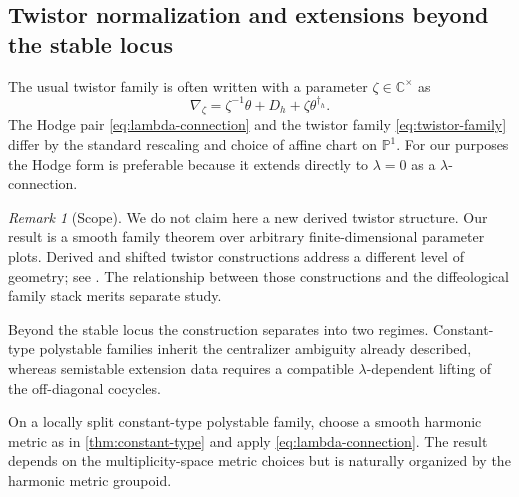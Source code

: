 \documentclass[11pt,reqno]{amsart}
\theoremstyle{definition}
\theoremstyle{remark}
\newtheorem{remark}[theorem]{Remark}
\newcommand{\C}{\mathbb C}
\begin{document}
\subsection{Twistor normalization and extensions beyond the stable locus}

The usual twistor family is often written with a parameter $\zeta\in\C^\times$ as
\begin{equation}\label{eq:twistor-family}
  \nabla_\zeta
  =\zeta^{-1}\theta+D_h+\zeta\theta^{\dagger_h}.
\end{equation}
The Hodge pair \eqref{eq:lambda-connection} and the twistor family \eqref{eq:twistor-family} differ by the standard rescaling and choice of affine chart on $\mathbb P^1$.  For our purposes the Hodge form is preferable because it extends directly to $\lambda=0$ as a $\lambda$-connection.

\begin{remark}[Scope]
We do not claim here a new derived twistor structure.  Our result is a smooth family theorem over arbitrary finite-dimensional parameter plots.  Derived and shifted twistor constructions address a different level of geometry; see \cite{KryczkaTanakaYau2026}.  The relationship between those constructions and the diffeological family stack merits separate study.
\end{remark}


Beyond the stable locus the construction separates into two regimes.  Constant-type polystable families inherit the centralizer ambiguity already described, whereas semistable extension data requires a compatible $\lambda$-dependent lifting of the off-diagonal cocycles.


On a locally split constant-type polystable family, choose a smooth harmonic metric as in \cref{thm:constant-type} and apply \eqref{eq:lambda-connection}.  The result depends on the multiplicity-space metric choices but is naturally organized by the harmonic metric groupoid.
\end{document}
